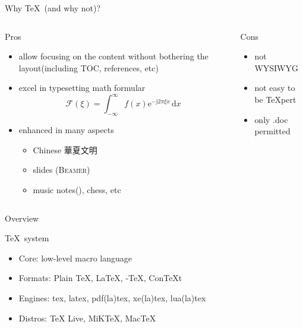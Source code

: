 \documentclass{beamer}
\def\TeXLive{\TeX{} Live\xspace}
\let\TL=\TeXLive
\begin{document}
\begin{frame}{Why \TeX\ (and why not)?}
  \begin{columns}[t]
    \begin{column}{.45\textwidth}
      \begin{block}{Pros}
        \begin{itemize}
          \item allow focusing on the content without bothering the
            layout(including TOC, references, etc)
          \item excel in typesetting math formular
            $$ \mathcal{F}(\xi)=\int_{-\infty}^{\infty}
            f(x)\mathrm{e}^{-\mathrm{j}2\pi \xi x}\,\mathrm{d}x $$
          \item enhanced in many aspects
            \begin{itemize}
              \item Chinese 華夏文明
              \item slides ({\scshape Beamer})
              \item music notes(\twonotes), chess, etc
            \end{itemize}
        \end{itemize}
      \end{block}
    \end{column}

    \begin{column}{.45\textwidth}
      \begin{block}{Cons}
        \begin{itemize}
          \item not WYSIWYG
          \item not easy to be \TeX{}pert
            \bigskip
          \item only .doc permitted
        \end{itemize}
      \end{block}
    \end{column}

  \end{columns}
\end{frame}

\begin{frame}{Overview}
  \begin{block}{\TeX\ system}
    \begin{itemize}
      \item Core: low-level macro language
      \item Formats: Plain \TeX, \alert{\LaTeX}, \AmS-\TeX, Con\TeX{}t
      \item Engines: tex, latex, pdf(la)tex, \alert{xe(la)tex}, lua(la)tex
      \item Distros: \TL, MiK\TeX, Mac\TeX
    \end{itemize}
  \end{block}
\end{frame}
\end{document}
